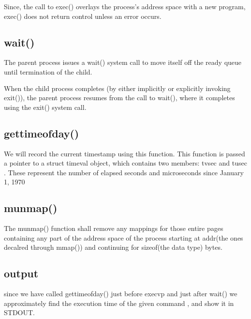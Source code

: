 \documentclass[12pt]{article}
\begin{document}
Since, the call to exec() overlays the process’s address space with a new program,
exec() does not return control unless an error occurs.

\subsection{wait()}
The parent process issues a wait() system call to move itself off the ready queue until termination of the child.

When the child process completes (by either implicitly or explicitly invoking exit()), the parent process resumes from the call to wait(), where it completes using the exit() system call. 

\subsection{gettimeofday()}

We will record the current timestamp using this function. This function is passed a
pointer to a struct timeval object, which contains two members: tv\textunderscore sec and t\textunderscore usec . These represent the number of elapsed seconds and microseconds since January 1, 1970

\subsection{munmap()}

The munmap() function shall remove any mappings for those entire pages containing any part of the address space of the process starting at addr(the ones decalred through mmap()) and continuing for sizeof(the data type) bytes.

\subsection{output}

since we have called gettimeofday() just before execvp and just after wait() we approximately find the execution time of the given command , and show it in STDOUT.
\end{document}
